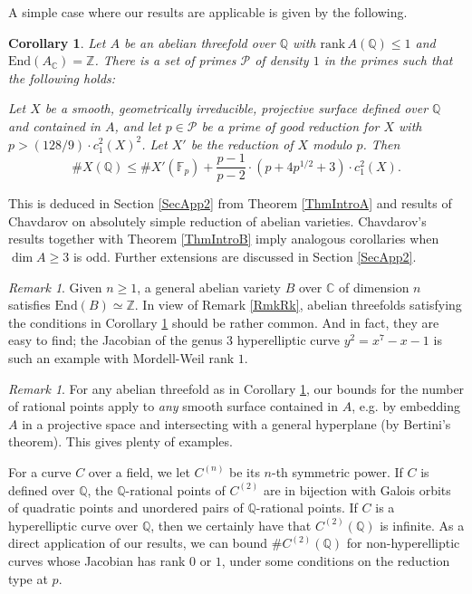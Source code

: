 \documentclass[11pt]{amsart}
\newtheorem{corollary}[theorem]{Corollary}
\theoremstyle{remark}
\newtheorem{remark}[theorem]{Remark}
\numberwithin{equation}{section}
\newcommand{\Pcal}{\mathscr{P}}
\newcommand{\Z}{\mathbb{Z}}
\newcommand{\C}{\mathbb{C}}
\newcommand{\F}{\mathbb{F}}
\newcommand{\Q}{\mathbb{Q}}
\newcommand{\End}{\mathrm{End}}
\newcommand{\rk}{\mathrm{rank}\,}
\begin{document}
A simple case where our results are applicable is given by the following.
\begin{corollary}\label{CoroDim3} Let $A$ be an abelian threefold over $\Q$ with $\rk A(\Q)\le 1$ and $\End (A_\C) = \Z$. There is a set of primes $\Pcal$ of density $1$ in the primes  such that the following holds:

Let $X$ be a smooth, geometrically irreducible, projective surface defined over $\Q$ and contained in $A$, and let $p\in \Pcal$ be a prime of good reduction for $X$ with $p>(128/9) \cdot c_1^2(X)^2$. Let $X'$ be the reduction of $X$ modulo $p$. Then
$$
\#X(\Q) \le \# X'(\F_p) + \frac{p-1}{p-2}\cdot \left(p+4p^{1/2} + 3\right)\cdot c_1^2(X).
$$
\end{corollary}



This is deduced in Section \ref{SecApp2} from Theorem \ref{ThmIntroA} and results of Chavdarov \cite{Chavdarov} on absolutely simple reduction of abelian varieties. Chavdarov's results together with Theorem \ref{ThmIntroB} imply analogous corollaries when $\dim A\ge 3$ is odd. Further extensions are discussed in Section \ref{SecApp2}.


\begin{remark} Given $n\ge 1$, a general abelian variety $B$ over $\C$ of  dimension $n$ satisfies $\End(B)\simeq \Z$. In view of Remark \ref{RmkRk}, abelian threefolds satisfying the conditions in Corollary \ref{CoroDim3} should be rather common. And in fact, they are easy to find; the Jacobian of the genus $3$ hyperelliptic curve $y^2=x^7-x-1$ is such an example with Mordell-Weil rank $1$.
\end{remark}

\begin{remark} For any abelian threefold as in Corollary \ref{CoroDim3}, our bounds for the number of rational points apply to \emph{any} smooth surface contained in $A$, e.g. by embedding $A$ in a projective space and intersecting with a general hyperplane (by Bertini's theorem). This gives plenty of examples.
\end{remark}

For a curve $C$ over a field, we let $C^{(n)}$ be its $n$-th symmetric power. If $C$ is defined over $\Q$, the $\Q$-rational points of $C^{(2)}$ are in bijection with Galois orbits of quadratic points and unordered pairs of $\Q$-rational points. If $C$ is a hyperelliptic curve over $\Q$, then we certainly have that $C^{(2)}(\Q)$ is infinite. As a direct application of our results, we can bound $\# C^{(2)}(\Q)$ for non-hyperelliptic curves  whose Jacobian has rank $0$ or  $1$, under some conditions on the reduction type at $p$. 
\end{document}
